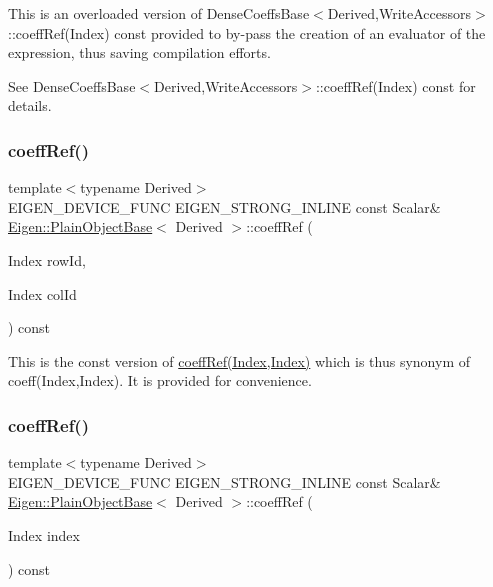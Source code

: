 This is an overloaded version of Dense\+Coeffs\+Base$<$\+Derived,\+Write\+Accessors$>$\+::coeff\+Ref(\+Index) const provided to by-\/pass the creation of an evaluator of the expression, thus saving compilation efforts.

See Dense\+Coeffs\+Base$<$\+Derived,\+Write\+Accessors$>$\+::coeff\+Ref(\+Index) const for details. \mbox{\label{class_eigen_1_1_plain_object_base_ab1b33ee10e4c72ec5cf354d511900e62}} 
\subsubsection{\texorpdfstring{coeffRef()}{coeffRef()}\hspace{0.1cm}{\footnotesize\ttfamily [3/4]}}
{\footnotesize\ttfamily template$<$typename Derived$>$ \\
E\+I\+G\+E\+N\+\_\+\+D\+E\+V\+I\+C\+E\+\_\+\+F\+U\+NC E\+I\+G\+E\+N\+\_\+\+S\+T\+R\+O\+N\+G\+\_\+\+I\+N\+L\+I\+NE const Scalar\& \mbox{\hyperlink{class_eigen_1_1_plain_object_base}{Eigen\+::\+Plain\+Object\+Base}}$<$ Derived $>$\+::coeff\+Ref (\begin{DoxyParamCaption}\item[{Index}]{row\+Id,  }\item[{Index}]{col\+Id }\end{DoxyParamCaption}) const\hspace{0.3cm}{\ttfamily [inline]}}

This is the const version of \mbox{\hyperlink{class_eigen_1_1_plain_object_base_a25626a55b26a4323565f79d1b7c48ea8}{coeff\+Ref(\+Index,\+Index)}} which is thus synonym of coeff(\+Index,\+Index). It is provided for convenience. \mbox{\label{class_eigen_1_1_plain_object_base_a982b56223d011e2f836a3408983883d4}} 
\subsubsection{\texorpdfstring{coeffRef()}{coeffRef()}\hspace{0.1cm}{\footnotesize\ttfamily [4/4]}}
{\footnotesize\ttfamily template$<$typename Derived$>$ \\
E\+I\+G\+E\+N\+\_\+\+D\+E\+V\+I\+C\+E\+\_\+\+F\+U\+NC E\+I\+G\+E\+N\+\_\+\+S\+T\+R\+O\+N\+G\+\_\+\+I\+N\+L\+I\+NE const Scalar\& \mbox{\hyperlink{class_eigen_1_1_plain_object_base}{Eigen\+::\+Plain\+Object\+Base}}$<$ Derived $>$\+::coeff\+Ref (\begin{DoxyParamCaption}\item[{Index}]{index }\end{DoxyParamCaption}) const\hspace{0.3cm}{\ttfamily [inline]}}

